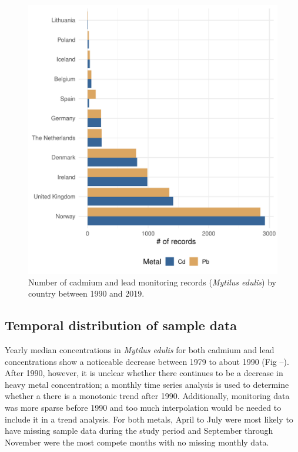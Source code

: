 \documentclass[
  12pt,
]{article}
\begin{document}
\begin{figure}
\centering
\includegraphics{McCrory_ENV972_Project_files/figure-latex/unnamed-chunk-2-1.pdf}
\caption{Number of cadmium and lead monitoring records (\emph{Mytilus
edulis}) by country between 1990 and 2019.}
\end{figure}

\hypertarget{temporal-distribution-of-sample-data}{%
\subsection{Temporal distribution of sample
data}\label{temporal-distribution-of-sample-data}}

Yearly median concentrations in \emph{Mytilus edulis} for both cadmium
and lead concentrations show a noticeable decrease between 1979 to about
1990 (Fig --). After 1990, however, it is unclear whether there
continues to be a decrease in heavy metal concentration; a monthly time
series analysis is used to determine whether a there is a monotonic
trend after 1990. Additionally, monitoring data was more sparse before
1990 and too much interpolation would be needed to include it in a trend
analysis. For both metals, April to July were most likely to have
missing sample data during the study period and September through
November were the most compete months with no missing monthly data.
\end{document}
